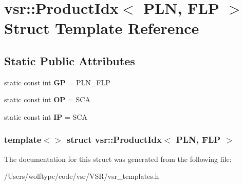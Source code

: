 \hypertarget{structvsr_1_1_product_idx_3_01_p_l_n_00_01_f_l_p_01_4}{\section{vsr\-:\-:Product\-Idx$<$ P\-L\-N, F\-L\-P $>$ Struct Template Reference}
\label{structvsr_1_1_product_idx_3_01_p_l_n_00_01_f_l_p_01_4}
}
\subsection*{Static Public Attributes}
\begin{DoxyCompactItemize}
\item 
\hypertarget{structvsr_1_1_product_idx_3_01_p_l_n_00_01_f_l_p_01_4_a9ec4da2974c448a97161518260b5fe13}{static const int {\bfseries G\-P} = P\-L\-N\-\_\-\-F\-L\-P}\label{structvsr_1_1_product_idx_3_01_p_l_n_00_01_f_l_p_01_4_a9ec4da2974c448a97161518260b5fe13}

\item 
\hypertarget{structvsr_1_1_product_idx_3_01_p_l_n_00_01_f_l_p_01_4_a5d4e4ede019d0c6273a480db53d78631}{static const int {\bfseries O\-P} = S\-C\-A}\label{structvsr_1_1_product_idx_3_01_p_l_n_00_01_f_l_p_01_4_a5d4e4ede019d0c6273a480db53d78631}

\item 
\hypertarget{structvsr_1_1_product_idx_3_01_p_l_n_00_01_f_l_p_01_4_af07ca556f37441d1a63ff1af713757b9}{static const int {\bfseries I\-P} = S\-C\-A}\label{structvsr_1_1_product_idx_3_01_p_l_n_00_01_f_l_p_01_4_af07ca556f37441d1a63ff1af713757b9}

\end{DoxyCompactItemize}
\subsubsection*{template$<$$>$ struct vsr\-::\-Product\-Idx$<$ P\-L\-N, F\-L\-P $>$}



The documentation for this struct was generated from the following file\-:\begin{DoxyCompactItemize}
\item 
/\-Users/wolftype/code/vsr/\-V\-S\-R/vsr\-\_\-templates.\-h\end{DoxyCompactItemize}

